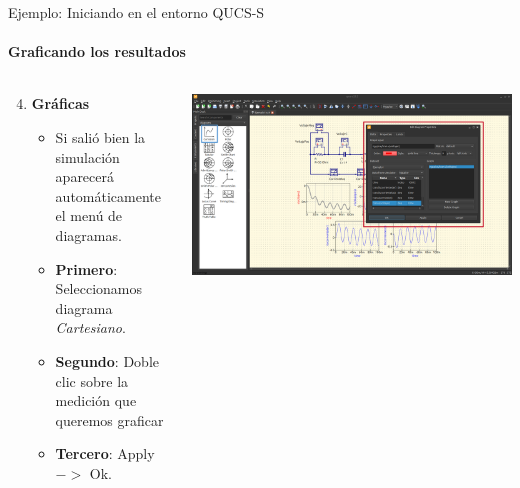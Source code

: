 \documentclass{beamer}
\begin{document}
\begin{frame}[fragile]{Ejemplo: Iniciando en el entorno QUCS-S}
  \framesubtitle{Graficando los resultados}

  \begin{columns}[T]
    \begin{column}{0.5\textwidth}
      \begin{enumerate}
        \setcounter{enumi}{3} %
        \item \textbf{Gráficas}
          \begin{itemize}
            \item Si salió bien la simulación aparecerá automáticamente el menú de diagramas.
            \item \textbf{Primero}: Seleccionamos diagrama \textit{Cartesiano}.
            \item \textbf{Segundo}: Doble clic sobre la medición que queremos graficar
            \item \textbf{Tercero}: Apply $->$ Ok.
          \end{itemize}
      \end{enumerate}
    \end{column}

    \begin{column}{0.5\textwidth}
      \includegraphics[width=\columnwidth]{Imagenes/Graph.png}
    \end{column}
  \end{columns}
\end{frame}
\end{document}
